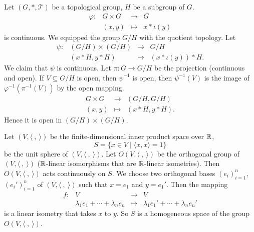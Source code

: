 \begin{exampleenv}
    Let $(G,*,\mathscr{T})$ be a topological group,
    $H$ be a subgroup of $G$.
    $$\begin{array}{rrcl}
        \varphi : & G \times G & \longrightarrow & G\\
        & (x,y) & \longmapsto & x * \iota(y)
    \end{array}$$
    is continuous.
    We equipped the group $G/H$ with the quotient topology.
    Let
    $$\begin{array}{rrcl}
        \psi : & (G/H) \times (G/H) & \longrightarrow & G/H\\
        & (x * H, y * H) & \longmapsto & (x * \iota(y)) * H.
    \end{array}$$
    We claim that $\psi$ is continuous.
    Let $\pi : G \rightarrow G/H$ be the projection (continuous and open).
    If $V \subseteq G/H$ is open, then $\psi^{-1}$ is open, then $\psi^{-1}(V)$ is the image of $\varphi^{-1}(\pi^{-1}(V))$ by the open mapping.
    $$\begin{array}{rcl}
        G \times G & \longrightarrow & (G/H, G/H)\\
        (x, y) & \longmapsto & (x * H, y * H).
    \end{array}$$
    Hence it is open in $(G/H) \times (G/H)$.
\end{exampleenv}

\begin{exampleenv}
    Let $(V, \langle\ ,\ \rangle)$ be the finite-dimensional inner product space over $\mathbb{R}$,
    $$ S =\{x \in V \mid \langle x, x \rangle = 1\}$$
    be the unit sphere of $(V,\langle\ ,\ \rangle)$.
    Let $O(V,\langle\ ,\ \rangle)$ be the orthogonal group of $(V,\langle\ ,\ \rangle)$ ($\mathbb{R}$-linear isomorphisms that are $\mathbb{R}$-linear isometries).
    Then $O(V,\langle\ ,\ \rangle)$ acts continuously on $S$.
    We choose two orthogonal bases $\left(e_i\right)_{i=1}^n$, $\left(e_i'\right)_{i = 1}^{n}$ of $(V,\langle\ ,\ \rangle)$ such that $x = e_1$ and $y = e_1'$.
    Then the mapping
    $$\begin{array}{rrcl}
        f : & V & \longrightarrow & V\\
        & \lambda_1 e_1 + \cdots + \lambda_n e_n & \longmapsto & \lambda_1 e_1' + \cdots + \lambda_n e_n'
    \end{array}$$
    is a linear isometry that takes $x$ to $y$.
    So $S$ is a homogeneous space of the group $O(V,\langle\ ,\ \rangle)$.
\end{exampleenv}

